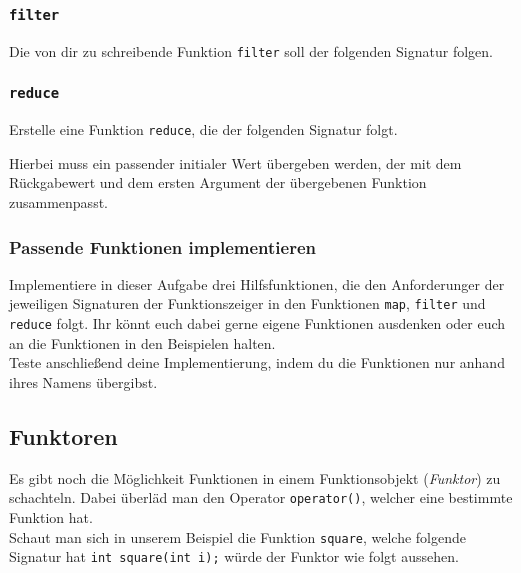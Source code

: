 \subsubsection{\lstinline{filter}}

Die von dir zu schreibende Funktion \lstinline{filter} soll der folgenden Signatur folgen.



\subsubsection{\lstinline{reduce}}

Erstelle eine Funktion \lstinline{reduce}, die der folgenden Signatur folgt.



Hierbei muss ein passender initialer Wert übergeben werden, der mit dem Rückgabewert und dem ersten Argument der übergebenen Funktion zusammenpasst.

\subsubsection{Passende Funktionen implementieren}
Implementiere in dieser Aufgabe drei Hilfsfunktionen, die den Anforderunger der jeweiligen Signaturen der Funktionszeiger in den Funktionen \lstinline{map}, \lstinline{filter} und \lstinline{reduce} folgt.
Ihr könnt euch dabei gerne eigene Funktionen ausdenken oder euch an die Funktionen in den Beispielen halten. \\

Teste anschließend deine Implementierung, indem du die Funktionen nur anhand ihres Namens übergibst.

\subsection{Funktoren}
\label{sec:functional_functor}
Es gibt noch die Möglichkeit Funktionen in einem Funktionsobjekt (\emph{Funktor}) zu schachteln.
Dabei überläd man den Operator \lstinline{operator()}, welcher eine bestimmte Funktion hat. \\

Schaut man sich in unserem Beispiel die Funktion \lstinline{square}, welche folgende Signatur hat \lstinline{int square(int i);} würde der Funktor wie folgt aussehen.



